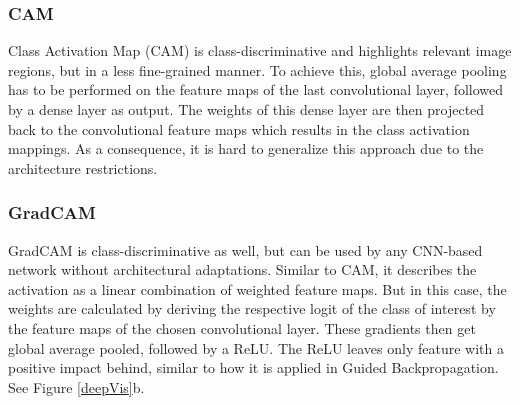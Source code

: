 \documentclass{article}
\begin{document}
\subsubsection{CAM}
Class Activation Map (CAM)\cite{ZhouKLOT15} is class-discriminative and highlights relevant image regions, but in a less fine-grained manner.
To achieve this, global average pooling has to be performed on the feature maps of the last convolutional layer, followed by a dense layer as output.
The weights of this dense layer are then projected back to the convolutional feature maps which results in the class activation mappings.
As a consequence, it is hard to generalize this approach due to the architecture restrictions.
\subsubsection{GradCAM}
GradCAM\cite{SelvarajuDVCPB16} is class-discriminative as well, but can be used by any CNN-based network without architectural adaptations.
Similar to CAM, it describes the activation as a linear combination of weighted feature maps. But in this case, the weights are calculated
by deriving the respective logit of the class of interest by the feature maps of the chosen convolutional layer. These gradients then get global average pooled, followed by a ReLU.
The ReLU leaves only feature with a positive impact behind, similar to how it is applied in Guided Backpropagation. See Figure \ref{deepVis}b.
\end{document}
